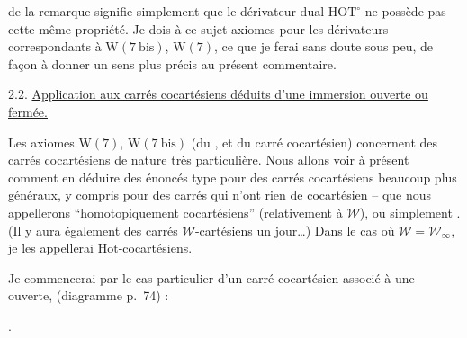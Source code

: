 
de la remarque  signifie simplement que
le dérivateur dual $\mathrm{HOT}^{\circ}$ ne possède
pas cette même propriété. Je dois  à ce
sujet   axiomes pour les dérivateurs correspondants à $\mathrm W(7\ \mathrm{bis})$, $\mathrm W(7)$, ce que je ferai
sans doute sous peu, de façon à donner
un sens plus précis au présent commentaire.

2.2. \uline{Application aux carrés cocartésiens déduits
d'une immersion ouverte ou fermée.}

Les axiomes $\mathrm W(7)$, $\mathrm W(7\ \mathrm{bis})$ (du ,  et du
carré cocartésien) concernent des carrés cocartésiens
de nature très particulière. Nous allons
voir à présent comment en déduire des
énoncés   type pour des carrés cocartésiens
beaucoup plus généraux, y compris pour des
carrés qui n'ont rien de cocartésien  --
  que nous appellerons ``homotopiquement
cocartésiens'' (relativement à $\mathcal W$), ou simplement
. (Il y aura également des carrés
$\mathcal W$-cartésiens un jour\ldots) Dans le cas où
$\mathcal W=\mathcal W_\infty$, je les appellerai  $\mathrm{Hot}$-cocartésiens.

Je commencerai par le cas particulier
d'un carré cocartésien associé à une 
ouverte, (diagramme  p.~74) :

.

